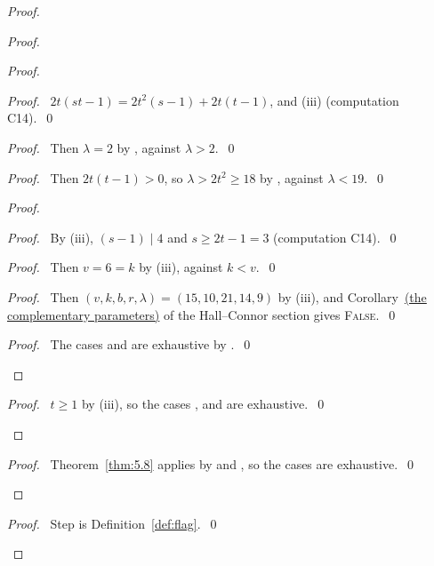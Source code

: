 \begin{proof}
\begin{proof}
  \begin{proof}
   \begin{proof}\pf\ $2t(st-1)=2t^2(s-1)+2t(t-1)$, and (iii) (computation C14).~\qed\end{proof}
   \begin{proof}\pf\ Then $\lambda=2$ by , against $\lambda>2$.~\qed\end{proof}
   \begin{proof}\pf\ Then $2t(t-1)>0$, so $\lambda>2t^2\ge18$ by , against
    $\lambda<19$.~\qed\end{proof}
   \begin{proof}
    \begin{proof}\pf\ By (iii), $(s-1)\mid4$ and $s\ge2t-1=3$ (computation C14).~\qed\end{proof}
    \begin{proof}\pf\ Then $v=6=k$ by (iii), against $k<v$.~\qed\end{proof}
    \begin{proof}\pf\ Then $(v,k,b,r,\lambda)=(15,10,21,14,9)$ by (iii), and
     Corollary~\hyperref[hc:cor:complement]{(the complementary parameters)} of the Hall--Connor
     section gives \textsc{False}.~\qed\end{proof}
    \qedstep
    \begin{proof}\pf\ The cases  and  are exhaustive by
     .~\qed\end{proof}
   \end{proof}
   \qedstep
   \begin{proof}\pf\ $t\ge1$ by (iii), so the cases ,  and
     are exhaustive.~\qed\end{proof}
  \end{proof}
  \qedstep
  \begin{proof}\pf\ Theorem~\ref{thm:5.8} applies by  and , so the
   cases are exhaustive.~\qed\end{proof}
 \end{proof}
 \qedstep
 \begin{proof}\pf\ Step  is Definition~\ref{def:flag}.~\qed\end{proof}
\end{proof}

